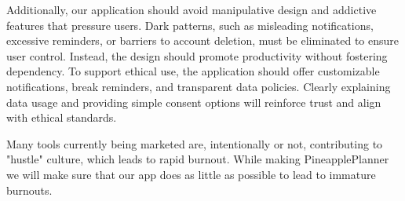 \documentclass{article}
\begin{document}
Additionally, our application should avoid manipulative design and addictive features that pressure users.
Dark patterns, such as misleading notifications, excessive reminders, or barriers to account deletion, must be eliminated to ensure user control.
Instead, the design should promote productivity without fostering dependency.
To support ethical use, the application should offer customizable notifications, break reminders, and transparent data policies.
Clearly explaining data usage and providing simple consent options will reinforce trust and align with ethical standards.
\cite{montag2019addictive}

Many tools currently being marketed are, intentionally or not, contributing to "hustle" culture, which leads to rapid burnout. 
While making PineapplePlanner we will make sure that our app does as little as possible to lead to immature burnouts.

\newpage
\end{document}
